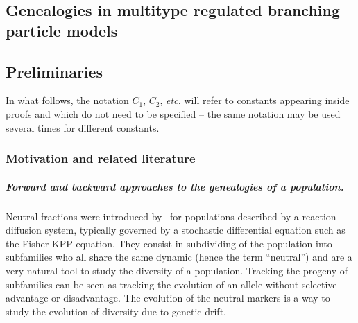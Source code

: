 \begin{refsegment}

\chapter[Genealogies in multitype regulated branching particle models]{Genealogies in multitype regulated branching particle models}\label{chp4_multitype}



\section{Preliminaries}

In what follows, the notation $C_1$, $C_2$, \textit{etc.} will refer to constants appearing inside proofs and which do not need to be specified -- the same notation may be used several times for different constants.

\subsection{Motivation and related literature}

\paragraph{Forward and backward approaches to the genealogies of a population.}
Neutral fractions were introduced by~\cite{hallatschek_gene_2008} for populations described by a reaction-diffusion system, typically governed by a stochastic differential equation such as the Fisher-KPP equation.
They consist in subdividing of the population into subfamilies who all share the same dynamic (hence the term ``neutral'') and are a very natural tool to study the diversity of a population.
Tracking the progeny of subfamilies can be seen as tracking the evolution of an allele without selective advantage or disadvantage.
The evolution of the neutral markers is a way to study the evolution of diversity due to genetic drift.  


\end{refsegment}
